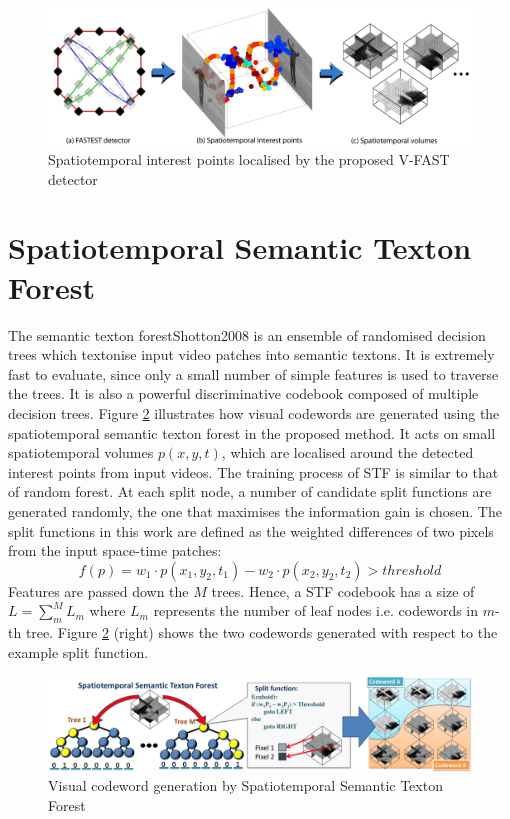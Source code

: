 \begin{figure}[h]
\centering
\includegraphics[width=0.8\linewidth]{fig/act/fig2_tot.pdf}%
\caption{Spatiotemporal interest points localised by the proposed V-FAST detector}
\label{fig/act/fastest}
\end{figure}

\section{Spatiotemporal Semantic Texton Forest}
\label{sec/act/stf}
The semantic texton forest{Shotton2008} is an ensemble of randomised decision trees which textonise input video patches into semantic textons. It is extremely fast to evaluate, since only a small number of simple features is used to traverse the trees. It is also a powerful discriminative codebook composed of multiple decision trees. Figure \ref{fig/act/stf} illustrates how visual codewords are generated using the spatiotemporal semantic texton forest in the proposed method. It acts on small spatiotemporal volumes $p(x,y,t)$, which are localised around the detected interest points from input videos. The training process of STF is similar to that of random forest. At each split node, a number of candidate split functions are generated randomly, the one that maximises the information gain is chosen. The split functions in this work are defined as the weighted differences of two pixels from the input space-time patches: 
\begin{equation}
\mathit{f}(p) = w_1 \cdot p(x_1,y_2,t_1) - w_2 \cdot p(x_2,y_2,t_2) > threshold
\end{equation}
Features are passed down the $M$ trees. Hence, a STF codebook has a size of $L=\sum_m^M L_m$  where $L_m$ represents the number of leaf nodes i.e. codewords in $m$-th tree. Figure \ref{fig/act/stf} (right) shows the two codewords generated with respect to the example split function.
\begin{figure}
\includegraphics[width=1\linewidth]{fig/act/stf.pdf}%
\caption{Visual codeword generation by Spatiotemporal Semantic Texton Forest}
\label{fig/act/stf}
\end{figure}
